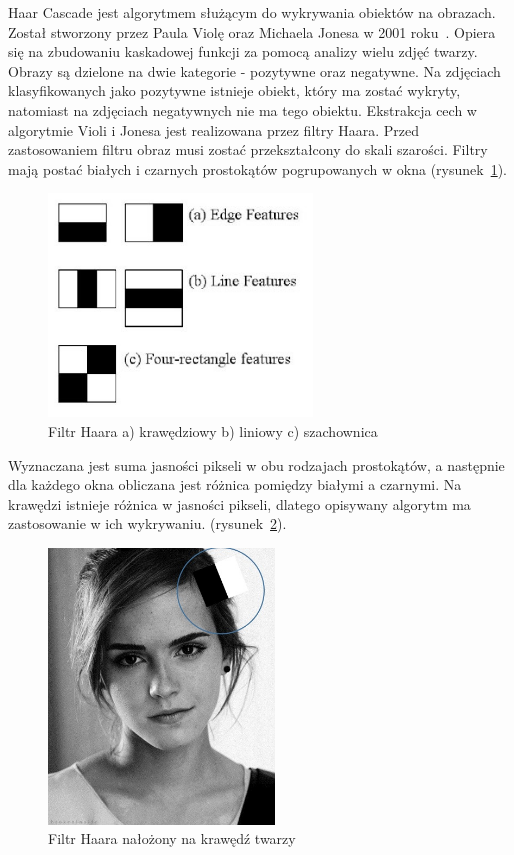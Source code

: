 \documentclass[a4paper,twoside,12pt]{book}
\begin{document}
    Haar Cascade jest algorytmem służącym do wykrywania obiektów na obrazach.
    Został stworzony przez Paula Violę oraz Michaela Jonesa w 2001 roku~\cite{violaJones}.
    Opiera się na zbudowaniu kaskadowej funkcji za pomocą analizy wielu zdjęć twarzy.
    Obrazy są dzielone na
    dwie kategorie - pozytywne oraz negatywne.
    Na zdjęciach klasyfikowanych jako pozytywne istnieje obiekt, który ma zostać wykryty, natomiast
    na zdjęciach negatywnych nie ma tego obiektu.
    Ekstrakcja cech w algorytmie Violi i Jonesa jest realizowana przez filtry Haara.
    Przed zastosowaniem filtru obraz musi zostać przekształcony do skali szarości.
    Filtry mają postać białych i czarnych prostokątów pogrupowanych w okna (rysunek~\ref{fig.haarRectangles}).
    \begin{figure}
        \centering
        \includegraphics[width=7cm]{Obrazy/Haar_filter_rectangles.jpg}
        \caption{Filtr Haara a) krawędziowy b) liniowy c) szachownica~\cite{haar}}
        \label{fig.haarRectangles}
    \end{figure}
    Wyznaczana jest suma jasności pikseli w obu rodzajach prostokątów, a
    następnie dla każdego okna obliczana jest różnica pomiędzy białymi a czarnymi.
    Na krawędzi istnieje różnica w jasności pikseli, dlatego opisywany algorytm ma zastosowanie w ich wykrywaniu.
    (rysunek~\ref{fig.haarEmmaWatson}).

    \begin{figure}
        \centering
        \includegraphics[width=6cm]{Obrazy/haarEmmaWatson.jpg}
        \caption{Filtr Haara nałożony na krawędź twarzy~\cite{haar}}
        \label{fig.haarEmmaWatson}
    \end{figure}
\end{document}
